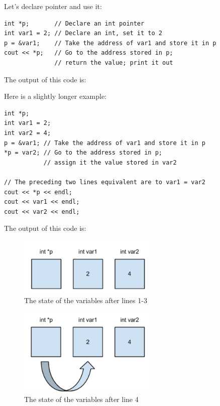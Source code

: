 Let's declare pointer  and use it:

\noindent\begin{minipage}{\linewidth}\begin{lstlisting}
int *p;       // Declare an int pointer
int var1 = 2; // Declare an int, set it to 2
p = &var1;    // Take the address of var1 and store it in p
cout << *p;   // Go to the address stored in p;
              // return the value; print it out
\end{lstlisting}\end{minipage}

\noindent The output of this code is:

\noindent {}

Here is a slightly longer example:

\noindent\begin{minipage}{\linewidth}\begin{lstlisting}
int *p;
int var1 = 2;
int var2 = 4;
p = &var1; // Take the address of var1 and store it in p
*p = var2; // Go to the address stored in p; 
           // assign it the value stored in var2

// The preceding two lines equivalent are to var1 = var2
cout << *p << endl;
cout << var1 << endl;
cout << var2 << endl;
\end{lstlisting}\end{minipage}

The output of this code is:

\noindent {}

\noindent {}

\noindent {}

\begin{figure}[tbh]
  \centering
  \includegraphics[width=0.6\textwidth]{diagrams/pointer-example-1.pdf}
  \caption{The state of the variables after lines 1-3} \label{fig:pointer-example-1} 
\end{figure}

\begin{figure}[tbh]
  \centering
  \includegraphics[width=0.6\textwidth]{diagrams/pointer-example-2.pdf}
  \caption{The state of the variables after line 4} \label{fig:pointer-example-2} 
\end{figure}

